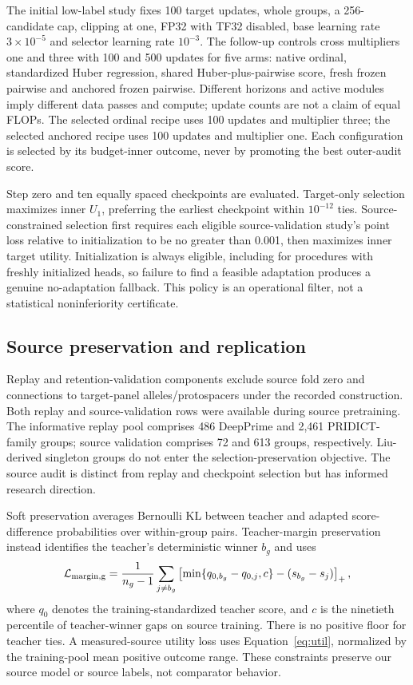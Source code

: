 The initial low-label study fixes 100 target updates, whole groups, a 256-candidate cap, clipping at one, FP32 with TF32 disabled, base learning rate $3\times10^{-5}$ and selector learning rate $10^{-3}$. The follow-up controls cross multipliers one and three with 100 and 500 updates for five arms: native ordinal, standardized Huber regression, shared Huber-plus-pairwise score, fresh frozen pairwise and anchored frozen pairwise. Different horizons and active modules imply different data passes and compute; update counts are not a claim of equal FLOPs. The selected ordinal recipe uses 100 updates and multiplier three; the selected anchored recipe uses 100 updates and multiplier one. Each configuration is selected by its budget-inner outcome, never by promoting the best outer-audit score.

Step zero and ten equally spaced checkpoints are evaluated. Target-only selection maximizes inner $U_1$, preferring the earliest checkpoint within $10^{-12}$ ties. Source-constrained selection first requires each eligible source-validation study's point loss relative to initialization to be no greater than 0.001, then maximizes inner target utility. Initialization is always eligible, including for procedures with freshly initialized heads, so failure to find a feasible adaptation produces a genuine no-adaptation fallback. This policy is an operational filter, not a statistical noninferiority certificate.

\subsection{Source preservation and replication}
Replay and retention-validation components exclude source fold zero and connections to target-panel alleles/protospacers under the recorded construction. Both replay and source-validation rows were available during source pretraining. The informative replay pool comprises 486 DeepPrime and 2,461 PRIDICT-family groups; source validation comprises 72 and 613 groups, respectively. Liu-derived singleton groups do not enter the selection-preservation objective. The source audit is distinct from replay and checkpoint selection but has informed research direction.

Soft preservation averages Bernoulli KL between teacher and adapted score-difference probabilities over within-group pairs. Teacher-margin preservation instead identifies the teacher's deterministic winner $b_g$ and uses
\begin{equation}
\mathcal L_{\rm margin,g}=\frac{1}{n_g-1}\sum_{j\neq b_g}
\left[\min\{q_{0,b_g}-q_{0,j},c\}-(s_{b_g}-s_j)\right]_+,
\label{eq:margin}
\end{equation}
where $q_0$ denotes the training-standardized teacher score, and $c$ is the ninetieth percentile of teacher-winner gaps on source training. There is no positive floor for teacher ties. A measured-source utility loss uses Equation~\ref{eq:util}, normalized by the training-pool mean positive outcome range. These constraints preserve our source model or source labels, not comparator behavior.

